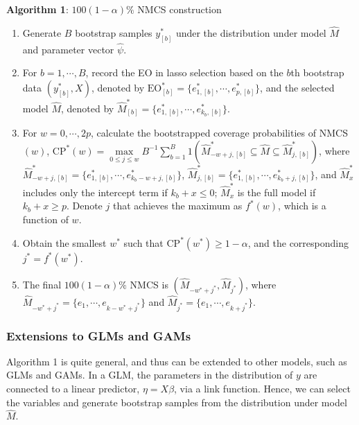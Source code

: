 \documentclass[12pt]{article} %
\theoremstyle{definition}
\begin{document}
{\bf Algorithm 1}: $100(1-\alpha)\%$ NMCS construction
\begin{enumerate}
    \item Generate $B$ bootstrap samples $y^*_{[b]}$ under the distribution under model $\hat{M}$ and parameter vector $\hat{\psi}$.
    \item For $b=1,\cdots, B$, record the EO in lasso selection based on the $b$th bootstrap data $(y^*_{[b]}, X)$, denoted by $\text{EO}^*_{[b]}= \{e_{1,[b]}^*, \cdots, e_{p,[b]}^*\}$, and the selected model $\hat{M}$, denoted by $\hat{M}^*_{[b]} = \{e_{1,[b]}^*, \cdots, e_{k_b,[b]}^*\}$.
    \item For $w=0,\cdots, 2p$, calculate the bootstrapped coverage probabilities of NMCS$(w)$, ${\text{CP}}^*(w) = \max\limits_{0 \leq j \leq w}B^{-1}\sum_{b=1}^B 1(\hat{M}^*_{-w+j,[b]} \subseteq \hat{M} \subseteq \hat{M}^*_{j,[b]})$, where $\hat{M}^*_{-w+j,[b]} = \{e_{1,[b]}^*, \cdots, e_{k_b-w+j,[b]}^*\}$, $\hat{M}^*_{j,[b]} = \{e_{1,[b]}^*, \cdots, e_{k_b+j,[b]}^*\}$, and $\hat{M}^*_x$ includes only the intercept term if $k_b+ x\leq 0$; $\hat{M}^*_x$ is the full model if $k_b+ x\geq p$. Denote $j$ that achieves the maximum as $f^{*}(w)$, which is a function of $w$. 
  
    \item Obtain the smallest $w^*$ such that ${\text{CP}}^*(w^*) \geq 1-\alpha$, and the corresponding $j^*= f^*(w^*)$.
    \item The final $100(1-\alpha)\%$ NMCS is $(\hat{M}_{-w^*+j^*}, \hat{M}_{j^*})$, where $\hat{M}_{-w^*+j^*} = \{e_1, \cdots, e_{k-w^*+j^*}\}$ and $\hat{M}_{j^*}= \{e_1, \cdots, e_{k+j^*}\}$.
\end{enumerate}

\subsubsection{Extensions to GLMs and GAMs}
Algorithm 1 is quite general, and thus can be extended to other models, such as GLMs and GAMs. In a GLM, the parameters in the distribution of $y$ are connected to a linear predictor, $\eta= X\beta$, via a link function. Hence, we can select the variables and generate bootstrap samples from the distribution under model $\hat{M}$. 
\end{document}
